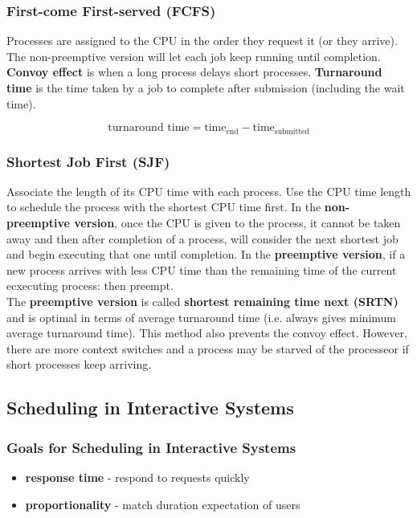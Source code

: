 \documentclass{article}
\renewcommand{\b}{\item[$\circ$]}
\newcommand{\newlist}{\begin{itemize}}
\renewcommand{\endlist}{\end{itemize}}
\begin{document}
    \subsubsection{First-come First-served (FCFS)}

    Processes are assigned to the CPU in the order they request it (or they arrive). The non-preemptive version will let each job keep running until completion. \textbf{Convoy effect} is when a long process delays short processes. \textbf{Turnaround time} is the time taken by a job to complete after submission (including the wait time). 

    $$\textrm{turnaround time} = \textrm{time}_{\textrm{end}} - \textrm{time}_{\textrm{submitted}}$$
    
    \subsubsection{Shortest Job First (SJF)}

    Associate the length of its CPU time with each process. Use the CPU time length to schedule the process with the shortest CPU time first. In the \textbf{non-preemptive version}, once the CPU is given to the process, it cannot be taken away and then after completion of a process, will consider the next shortest job and begin executing that one until completion. In the \textbf{preemptive version}, if a new process arrives with less CPU time than the remaining time of the current ecxecuting process: then preempt. \\

    \noindent The \textbf{preemptive version} is called \textbf{shortest remaining time next (SRTN)} and is optimal in terms of average turnaround time (i.e. always gives minimum average turnaround time). This method also prevents the convoy effect. However, there are more context switches and a process may be starved of the processeor if short processes keep arriving. 

\subsection{Scheduling in Interactive Systems}
    
    \subsubsection{Goals for Scheduling in Interactive Systems}

    \newlist
    \b \textbf{response time} - respond to requests quickly
    \b \textbf{proportionality} - match duration expectation of users
    \endlist
\end{document}
